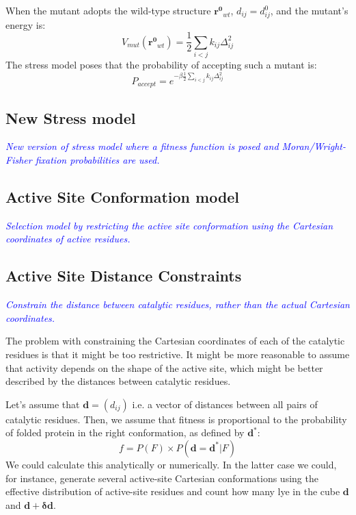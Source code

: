 \documentclass[12pt]{article}
\newcommand{\todo}[1]{\emph{\textcolor{blue} {#1}}}
\newcommand{\dij}{d_{ij}}
\begin{document}
When the mutant adopts the wild-type structure $\mathbf{r^0}_{wt}$, $d_{ij} = d_{ij}^0$, and the mutant's energy is:
\begin{equation} \label{eq:Vmut0}
V_{mut}(\mathbf{r^0}_{wt}) = \frac{1}{2} \sum_{i<j} k_{ij} \Delta_{ij}^2
\end{equation}
The stress model poses that the probability of accepting such a mutant is:
\begin{equation} \label{eq:Paccept}
P_{accept} = e^{-\beta \frac{1}{2} \sum_{i<j} k_{ij} \Delta_{ij}^2}
\end{equation}

\subsection{New Stress model}

\todo{New version of stress model where a fitness function is posed and Moran/Wright-Fisher fixation probabilities are used.}

\subsection{Active Site Conformation model}

\todo{Selection model by restricting the active site conformation using the Cartesian coordinates of active residues.}

\subsection{Active Site Distance Constraints}

\todo{Constrain the distance between catalytic residues, rather than the actual Cartesian coordinates.}

The problem with constraining the Cartesian coordinates of each of the catalytic residues is that it might be too restrictive. It might be more reasonable to assume that activity depends on the shape of the active site, which might be better described by the distances between catalytic residues. 

Let's assume that $\mathbf{d} = (\dij)$ i.e. a vector of distances between all pairs of catalytic residues. Then, we assume that fitness is proportional to the probability of folded protein in the right conformation, as defined by $\mathbf{d}^*$:
\begin{equation}
f = P(F) \times P(\mathbf{d} = \mathbf{d}^*|F)
\end{equation}
We could calculate this analytically or numerically. In the latter case we could, for instance, generate several active-site Cartesian conformations using the effective distribution of active-site residues and count how many lye in the cube $\mathbf{d}$ and $\mathbf{d}+\mathbf{\delta d}$.
\end{document}
